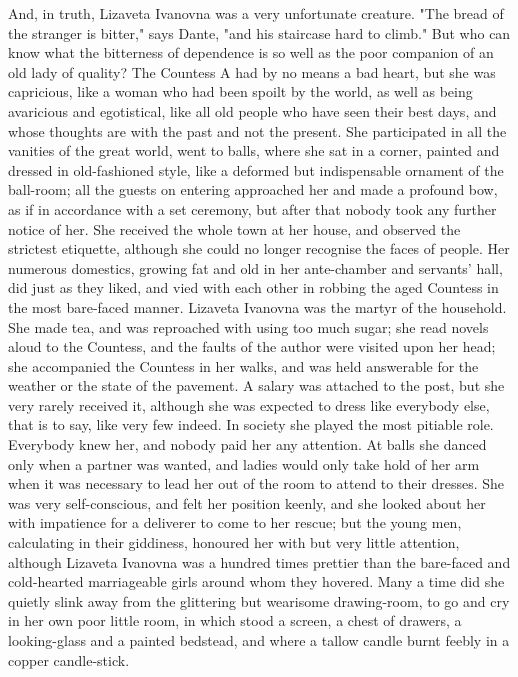 And, in truth, Lizaveta Ivanovna was a very unfortunate creature. "The
bread of the stranger is bitter," says Dante, "and his staircase hard
to climb." But who can know what the bitterness of dependence is so
well as the poor companion of an old lady of quality? The Countess
A had by no means a bad heart, but she was capricious, like a
woman who had been spoilt by the world, as well as being avaricious
and egotistical, like all old people who have seen their best days,
and whose thoughts are with the past and not the present. She
participated in all the vanities of the great world, went to balls,
where she sat in a corner, painted and dressed in old-fashioned style,
like a deformed but indispensable ornament of the ball-room; all the
guests on entering approached her and made a profound bow, as if in
accordance with a set ceremony, but after that nobody took any further
notice of her. She received the whole town at her house, and observed
the strictest etiquette, although she could no longer recognise the
faces of people. Her numerous domestics, growing fat and old in her
ante-chamber and servants' hall, did just as they liked, and vied with
each other in robbing the aged Countess in the most bare-faced manner.
Lizaveta Ivanovna was the martyr of the household. She made tea, and
was reproached with using too much sugar; she read novels aloud to the
Countess, and the faults of the author were visited upon her head; she
accompanied the Countess in her walks, and was held answerable for the
weather or the state of the pavement. A salary was attached to the
post, but she very rarely received it, although she was expected to
dress like everybody else, that is to say, like very few indeed. In
society she played the most pitiable role. Everybody knew her, and
nobody paid her any attention. At balls she danced only when a partner
was wanted, and ladies would only take hold of her arm when it was
necessary to lead her out of the room to attend to their dresses. She
was very self-conscious, and felt her position keenly, and she looked
about her with impatience for a deliverer to come to her rescue; but
the young men, calculating in their giddiness, honoured her with but
very little attention, although Lizaveta Ivanovna was a hundred times
prettier than the bare-faced and cold-hearted marriageable girls
around whom they hovered. Many a time did she quietly slink away from
the glittering but wearisome drawing-room, to go and cry in her own
poor little room, in which stood a screen, a chest of drawers, a
looking-glass and a painted bedstead, and where a tallow candle burnt
feebly in a copper candle-stick.

